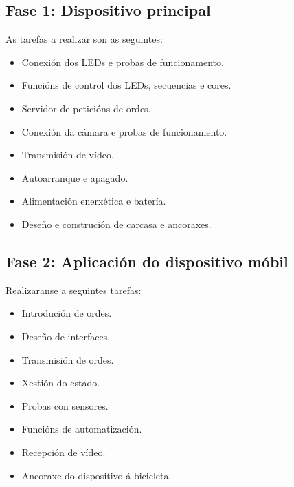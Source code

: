\subsection{Fase 1: Dispositivo principal}
As tarefas a realizar son as seguintes:
\begin{itemize}
    \item Conexión dos LEDs e probas de funcionamento.
    \item Funcións de control dos LEDs, secuencias e cores.
    \item Servidor de peticións de ordes.
    \item Conexión da cámara e probas de funcionamento.
    \item Transmisión de vídeo.
    \item Autoarranque e apagado.
    \item Alimentación enerxética e batería.
    \item Deseño e construción de carcasa e ancoraxes.
\end{itemize}
\subsection{Fase 2: Aplicación do dispositivo móbil}
Realizaranse a seguintes tarefas:
\begin{itemize}

    \item Introdución de ordes.
    \item Deseño de interfaces.
    \item Transmisión de ordes.
    \item Xestión do estado.
    \item Probas con sensores.
    \item Funcións de automatización.
    \item Recepción de vídeo.
    \item Ancoraxe do dispositivo á bicicleta.
\end{itemize}


